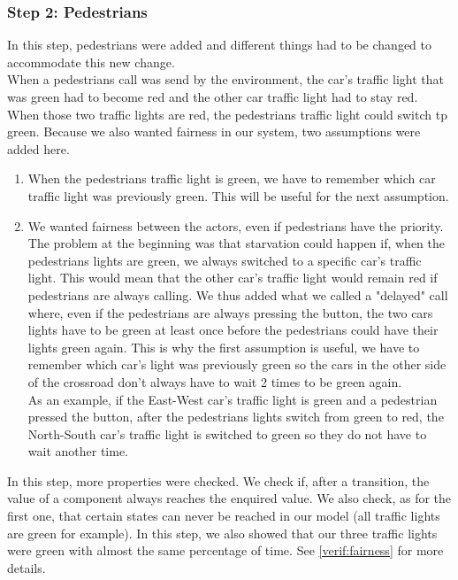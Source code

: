 \subsubsection{Step 2: Pedestrians}
In this step, pedestrians were added and different things had to be changed to accommodate this new change. \\ 

When a pedestrians call was send by the environment, the car's traffic light that was green had to become red and the other car traffic light had to stay red. When those two traffic lights are red, the pedestrians traffic light could switch tp green. Because we also wanted fairness in our system, two assumptions were added here.
\begin{enumerate}
    \item When the pedestrians traffic light is green, we have to remember which car traffic light was previously green. This will be useful for the next assumption.
    \item We wanted fairness between the actors, even if pedestrians have the priority. The problem at the beginning was that starvation could happen if, when the pedestrians lights are green, we always switched to a specific car's traffic light. This would mean that the other car's traffic light would remain red if pedestrians are always calling. We thus added what we called a "delayed" call where, even if the pedestrians are always pressing the button, the two cars lights have to be green at least once before the pedestrians could have their lights green again. This is why the first assumption is useful, we have to remember which car's light was previously green so the cars in the other side of the crossroad don't always have to wait 2 times to be green again. \\
    As an example, if the East-West car's traffic light is green and a pedestrian pressed the button, after the pedestrians lights switch from green to red, the North-South car's traffic light is switched to green so they do not have to wait another time.
\end{enumerate}
In this step, more properties were checked. We check if, after a transition, the value of a component always reaches the enquired value. We also check, as for the first one, that certain states can never be reached in our model (all traffic lights are green for example).
In this step, we also showed that our three traffic lights were green with almost the same percentage of time. See \ref{verif:fairness} for more details.


